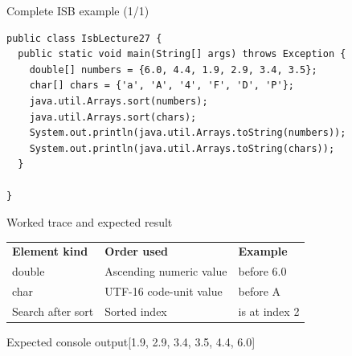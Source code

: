 \documentclass[10pt,aspectratio=169]{beamer}
\begin{document}
\begin{frame}[fragile,t]{Complete ISB example (1/1)}
\begin{lstlisting}
public class IsbLecture27 {
  public static void main(String[] args) throws Exception {
    double[] numbers = {6.0, 4.4, 1.9, 2.9, 3.4, 3.5};
    char[] chars = {'a', 'A', '4', 'F', 'D', 'P'};
    java.util.Arrays.sort(numbers);
    java.util.Arrays.sort(chars);
    System.out.println(java.util.Arrays.toString(numbers));
    System.out.println(java.util.Arrays.toString(chars));
  }

}
\end{lstlisting}
\end{frame}

\begin{frame}[fragile,t]{Worked trace and expected result}
\small\renewcommand{\arraystretch}{1.4}
\begin{tabularx}{\textwidth}{>{\raggedright\arraybackslash}X>{\raggedright\arraybackslash}X>{\raggedright\arraybackslash}X}\rowcolor{navy}
\color{white}\bfseries Element kind & \color{white}\bfseries Order used & \color{white}\bfseries Example\\
double & Ascending numeric value & 1.9 before 6.0\\
char & UTF{-}16 code{-}unit value & 4 before A\\
Search after sort & Sorted index & 3.4 is at index 2\\
\end{tabularx}\par\vspace{2mm}
\begin{block}{Expected console output}\ttfamily\footnotesize [1.9, 2.9, 3.4, 3.5, 4.4, 6.0]\par [4, A, D, F, P, a]\end{block}
\end{frame}
\end{document}
